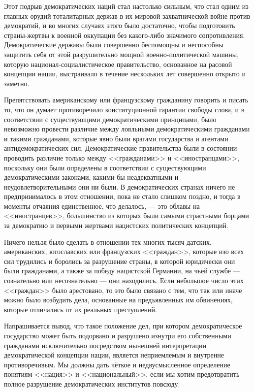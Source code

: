 Этот подрыв демократических наций стал настолько сильным, что стал одним из главных орудий тоталитарных держав в их мировой захватнической войне против демократий, и во многих случаях этого было достаточно, чтобы подготовить страны-жертвы к военной оккупации без какого-либо значимого сопротивления. Демократические державы были совершенно беспомощны и неспособны защитить себя от этой разрушительно мощной военно-политической машины, которую национал-социалистическое правительство, основанное на расовой концепции нации, выстраивало в течение нескольких лет совершенно открыто и заметно.

Препятствовать американскому или французскому гражданину говорить и писать то, что он думает противоречило конституционной гарантии свободы слова, и в соответствии с существующими демократическими принципами, было невозможно провести различие между лояльными демократическими гражданами и такими гражданами, которые явно были врагами государства и агентами антидемократических сил. Демократические правительства были в состоянии проводить различие только между <<гражданами>> и <<иностранцами>>, поскольку они были определены в соответствии с существующими демократическими законами, какими бы неадекватными и неудовлетворительными они ни были. В демократических странах ничего не предпринималось в этом отношении, пока не стало слишком поздно, и тогда в моменты отчаяния единственное, что делалось, — это облавы на <<иностранцев>>, большинство из которых были самыми страстными борцами за демократию и первыми жертвами нацистских политических концепций.

Ничего нельзя было сделать в отношении тех многих тысяч датских, американских, югославских или французских <<граждан>>, которые изо всех сил трудились и боролись за разрушение страны, в которой юридически они были гражданами, а также за победу нацистской Германии, на чьей службе — сознательно или несознательно — они находились. Если небольшое число этих <<граждан>> было арестовано, то это было связано с тем, что так или иначе можно было возбудить дела, основанные на предъявленных им обвинениях, которые отличались от их реальных преступлений.

Напрашивается вывод, что такое положение дел, при котором демократическое государство может быть подорвано и разрушено изнутри его собственными гражданами исключительно посредством нынешней интерпретации демократической концепции нации, является неприемлемым и внутренне противоречивым. Мы должны дать чёткое и недвусмысленное определение понятиям <<нация>> и <<национальный>>, если мы хотим предотвратить полное разрушение демократических институтов повсюду.

